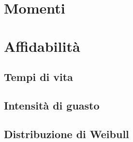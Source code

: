     \section{Momenti}
    \section{Affidabilità}
        \subsection{Tempi di vita}
        \subsection{Intensità di guasto}
        \subsection{Distribuzione di Weibull}
